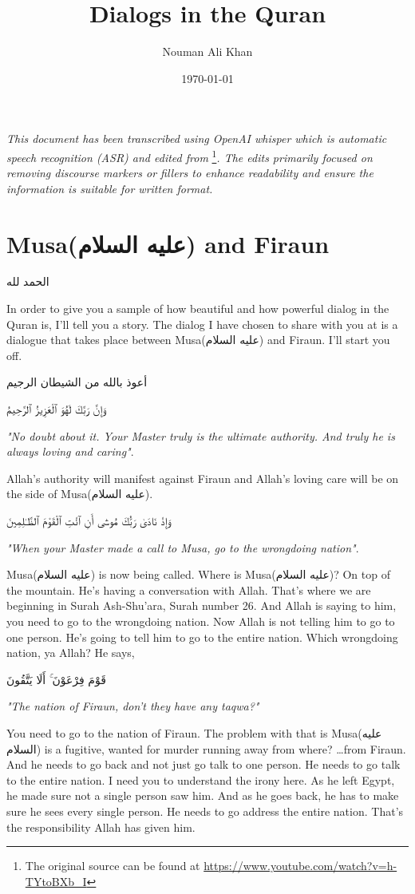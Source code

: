 \documentclass[12pt]{article}
\title{Dialogs in the Quran}
\author{Nouman Ali Khan}
\date{\today}
\newcommand{\as}{\textarabic{(عليه السلام)}}
\begin{document}
\maketitle

\emph{This document has been transcribed using OpenAI whisper which is automatic speech recognition (ASR) and edited from} \footnote{The original source can be found at \url{https://www.youtube.com/watch?v=h-TYtoBXb_I}}\emph{. The edits primarily focused on removing discourse markers or fillers to enhance readability and ensure the information is suitable for written format.}

\section*{Musa\as{} and Firaun}


\textarabic{الحمد لله} 

In order to give you a sample of how beautiful and how powerful dialog in the Quran is, I'll tell you a story. The dialog I have chosen to share with you at is a dialogue that takes place between Musa\as{} and Firaun. I'll start you off. 

\textarabic{أعوذ بالله من الشيطان الرجيم} 

\textarabic{وَإِنَّ رَبَّكَ لَهُوَ ٱلْعَزِيزُ ٱلرَّحِيمُ} 

\textit{"No doubt about it. Your Master truly is the ultimate authority. And truly he is always loving and caring"}. 

Allah's authority will manifest against Firaun and Allah's loving care will be on the side of Musa\as{}.  

\textarabic{وَإِذْ نَادَىٰ رَبُّكَ مُوسَىٰٓ أَنِ ٱئْتِ ٱلْقَوْمَ ٱلظَّـٰلِمِينَ} 

\textit{"When your Master made a call to Musa, go to the wrongdoing nation"}.

Musa\as{} is now being called. Where is Musa\as{}? On top of the mountain. He's having a conversation with Allah. That's where we are beginning in Surah Ash-Shu'ara, Surah number 26. And Allah is saying to him, you need to go to the wrongdoing nation. Now Allah is not telling him to go to one person. He's going to tell him to go to the entire nation. Which wrongdoing nation, ya Allah? He says, 

\textarabic{قَوْمَ فِرْعَوْنَ ۚ أَلَا يَتَّقُونَ} 

\textit{"The nation of Firaun, don't they have any taqwa?"} 

You need to go to the nation of Firaun. The problem with that is Musa\as{} is a fugitive, wanted for murder running away from where? \dots from Firaun. And he needs to go back and not just go talk to one person. He needs to go talk to the entire nation. I need you to understand the irony here. As he left Egypt, he made sure not a single person saw him. And as he goes back, he has to make sure he sees every single person. He needs to go address the entire nation. That's the responsibility Allah has given him. 
\end{document}
